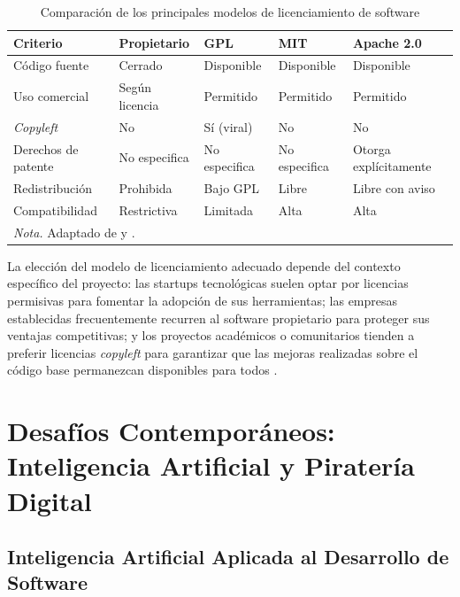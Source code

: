 \documentclass[11pt,a4paper]{report}
\begin{document}
\begin{table}[H]
\centering
\caption{Comparación de los principales modelos de licenciamiento de software}
\label{tab:licencias}
\begin{tabularx}{\textwidth}{@{}lXXXX@{}}
\toprule
\textbf{Criterio} & \textbf{Propietario} & \textbf{GPL} & \textbf{MIT} & \textbf{Apache 2.0} \\
\midrule
Código fuente      & Cerrado      & Disponible   & Disponible  & Disponible \\
Uso comercial      & Según licencia & Permitido  & Permitido   & Permitido \\
\textit{Copyleft}  & No           & Sí (viral)   & No          & No \\
Derechos de patente & No especifica & No especifica & No especifica & Otorga explícitamente \\
Redistribución     & Prohibida    & Bajo GPL     & Libre       & Libre con aviso \\
Compatibilidad     & Restrictiva  & Limitada     & Alta        & Alta \\
\midrule
\multicolumn{5}{l}{\small\textit{Nota.} Adaptado de \citet{euipo2022} y \citet{ompi2024}.} \\
\bottomrule
\end{tabularx}
\end{table}

La elección del modelo de licenciamiento adecuado depende del contexto específico del proyecto: las startups tecnológicas suelen optar por licencias permisivas para fomentar la adopción de sus herramientas; las empresas establecidas frecuentemente recurren al software propietario para proteger sus ventajas competitivas; y los proyectos académicos o comunitarios tienden a preferir licencias \textit{copyleft} para garantizar que las mejoras realizadas sobre el código base permanezcan disponibles para todos \citep{ompi2024, euipo2022}.

\newpage

\chapter{Desafíos Contemporáneos: Inteligencia Artificial y Piratería Digital}

\section{Inteligencia Artificial Aplicada al Desarrollo de Software}
\end{document}
